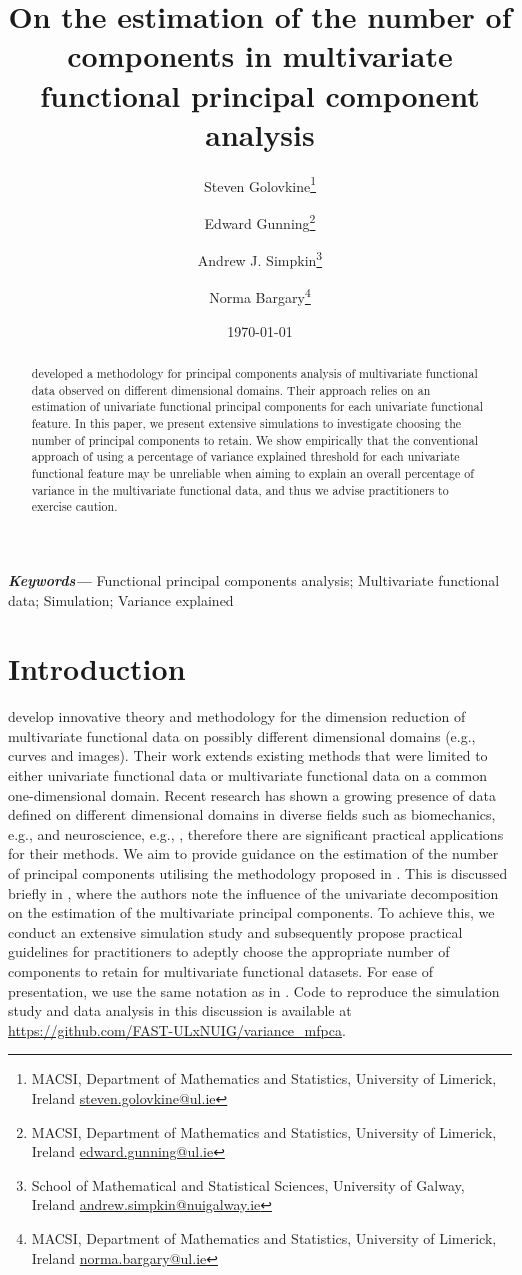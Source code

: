 \documentclass{article}
\title{On the estimation of the number of components in multivariate functional principal component analysis}
\author{%
Steven Golovkine\thanks{MACSI, Department of Mathematics and Statistics, University of Limerick, Ireland \href{mailto:steven.golovkine@ul.ie}{steven.golovkine@ul.ie}}
\and
Edward Gunning\thanks{MACSI, Department of Mathematics and Statistics, University of Limerick, Ireland \href{mailto:edward.gunning@ul.ie}{edward.gunning@ul.ie}}
\and
Andrew J. Simpkin\thanks{School of Mathematical and Statistical Sciences, University of Galway, Ireland \href{mailto:andrew.simpkin@nuigalway.ie}{andrew.simpkin@nuigalway.ie}}
\and
Norma Bargary\thanks{MACSI, Department of Mathematics and Statistics, University of Limerick, Ireland \href{mailto:norma.bargary@ul.ie}{norma.bargary@ul.ie}}
}
\date{\today}
\newcounter{th}
\providecommand{\keywords}[1]{\textbf{\textit{Keywords---}} #1}
\begin{document}
\maketitle

\begin{abstract}
\cite{happMultivariateFunctionalPrincipal2018} developed a methodology for principal components analysis of multivariate functional data observed on different dimensional domains. Their approach relies on an estimation of univariate functional principal components for each univariate functional feature. In this paper, we present extensive simulations to investigate choosing the number of principal components to retain. We show empirically that the conventional approach of using a percentage of variance explained threshold for each univariate functional feature may be unreliable when aiming to explain an overall percentage of variance in the multivariate functional data, and thus we advise practitioners to exercise caution.
\end{abstract}

\keywords{Functional principal components analysis; Multivariate functional data; Simulation; Variance explained}


\section{Introduction} %
\label{sec:introduction}

\cite{happMultivariateFunctionalPrincipal2018} develop innovative theory and methodology for the dimension reduction of multivariate functional data on possibly different dimensional domains (e.g., curves and images). Their work extends existing methods that were limited to either univariate functional data or multivariate functional data on a common one-dimensional domain. Recent research has shown a growing presence of data defined on different dimensional domains in diverse fields such as biomechanics, e.g., \cite{warmenhovenBivariateFunctionalPrincipal2019} and neuroscience, e.g., \cite{songSparseMultivariateFunctional2022}, therefore there are significant practical applications for their methods. We aim to provide guidance on the estimation of the number of principal components utilising the methodology proposed in \cite{happMultivariateFunctionalPrincipal2018}. This is discussed briefly in \citet[Online Supplement, Section 2.3]{happMultivariateFunctionalPrincipal2018}, where the authors note the influence of the univariate decomposition on the estimation of the multivariate principal components. To achieve this, we conduct an extensive simulation study and subsequently propose practical guidelines for practitioners to adeptly choose the appropriate number of components to retain for multivariate functional datasets. For ease of presentation, we use the same notation as in \cite{happMultivariateFunctionalPrincipal2018}. Code to reproduce the simulation study and data analysis in this discussion is available at \url{https://github.com/FAST-ULxNUIG/variance_mfpca}.
\end{document}
